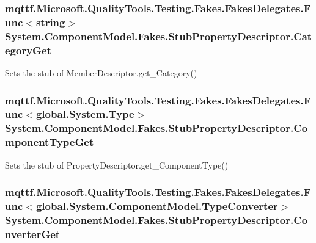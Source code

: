 \hypertarget{class_system_1_1_component_model_1_1_fakes_1_1_stub_property_descriptor_abdd85ca9413ba8181ad10a2ae23c8b45}{
\subsubsection[{Category\-Get}]{\setlength{\rightskip}{0pt plus 5cm}mqttf.\-Microsoft.\-Quality\-Tools.\-Testing.\-Fakes.\-Fakes\-Delegates.\-Func$<$string$>$ System.\-Component\-Model.\-Fakes.\-Stub\-Property\-Descriptor.\-Category\-Get}}\label{class_system_1_1_component_model_1_1_fakes_1_1_stub_property_descriptor_abdd85ca9413ba8181ad10a2ae23c8b45}


Sets the stub of Member\-Descriptor.\-get\-\_\-\-Category()

\hypertarget{class_system_1_1_component_model_1_1_fakes_1_1_stub_property_descriptor_aca3eccc07df44328abf6eb6a3750441e}{
\subsubsection[{Component\-Type\-Get}]{\setlength{\rightskip}{0pt plus 5cm}mqttf.\-Microsoft.\-Quality\-Tools.\-Testing.\-Fakes.\-Fakes\-Delegates.\-Func$<$global.\-System.\-Type$>$ System.\-Component\-Model.\-Fakes.\-Stub\-Property\-Descriptor.\-Component\-Type\-Get}}\label{class_system_1_1_component_model_1_1_fakes_1_1_stub_property_descriptor_aca3eccc07df44328abf6eb6a3750441e}


Sets the stub of Property\-Descriptor.\-get\-\_\-\-Component\-Type()

\hypertarget{class_system_1_1_component_model_1_1_fakes_1_1_stub_property_descriptor_a70f5d7979f5db32d3ab56748b610a778}{
\subsubsection[{Converter\-Get}]{\setlength{\rightskip}{0pt plus 5cm}mqttf.\-Microsoft.\-Quality\-Tools.\-Testing.\-Fakes.\-Fakes\-Delegates.\-Func$<$global.\-System.\-Component\-Model.\-Type\-Converter$>$ System.\-Component\-Model.\-Fakes.\-Stub\-Property\-Descriptor.\-Converter\-Get}}\label{class_system_1_1_component_model_1_1_fakes_1_1_stub_property_descriptor_a70f5d7979f5db32d3ab56748b610a778}


